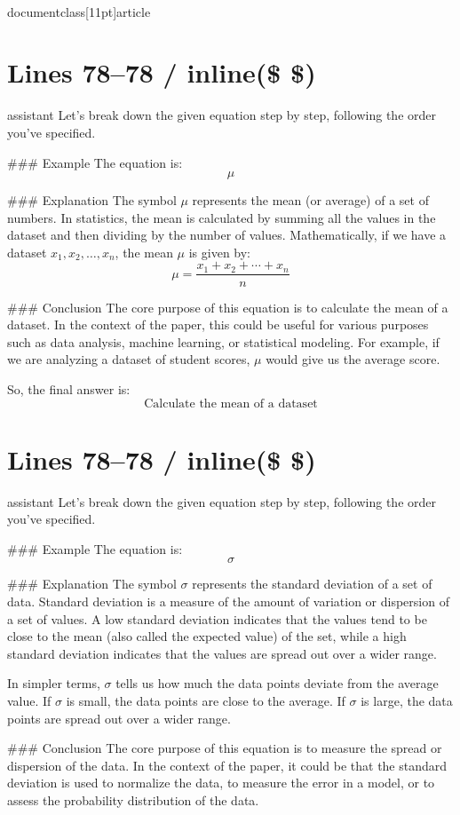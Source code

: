 \\documentclass[11pt]{article}
\begin{document}
\section*{Lines 78–78 / inline(\$ \$) }
assistant
Let's break down the given equation step by step, following the order you've specified.

### Example
The equation is:
\[
\mu
\]

### Explanation
The symbol \(\mu\) represents the mean (or average) of a set of numbers. In statistics, the mean is calculated by summing all the values in the dataset and then dividing by the number of values. Mathematically, if we have a dataset \(x_1, x_2, \ldots, x_n\), the mean \(\mu\) is given by:
\[
\mu = \frac{x_1 + x_2 + \cdots + x_n}{n}
\]

### Conclusion
The core purpose of this equation is to calculate the mean of a dataset. In the context of the paper, this could be useful for various purposes such as data analysis, machine learning, or statistical modeling. For example, if we are analyzing a dataset of student scores, \(\mu\) would give us the average score.

So, the final answer is:
\[
\boxed{\text{Calculate the mean of a dataset}}
\]


\section*{Lines 78–78 / inline(\$ \$) }
assistant
Let's break down the given equation step by step, following the order you've specified.

### Example
The equation is:
\[
\sigma
\]

### Explanation
The symbol \(\sigma\) represents the standard deviation of a set of data. Standard deviation is a measure of the amount of variation or dispersion of a set of values. A low standard deviation indicates that the values tend to be close to the mean (also called the expected value) of the set, while a high standard deviation indicates that the values are spread out over a wider range.

In simpler terms, \(\sigma\) tells us how much the data points deviate from the average value. If \(\sigma\) is small, the data points are close to the average. If \(\sigma\) is large, the data points are spread out over a wider range.

### Conclusion
The core purpose of this equation is to measure the spread or dispersion of the data. In the context of the paper, it could be that the standard deviation is used to normalize the data, to measure the error in a model, or to assess the probability distribution of the data.
\end{document}
